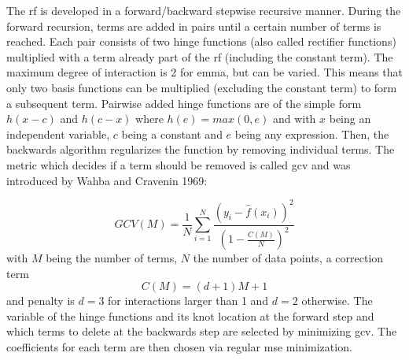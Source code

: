 The \gls{rf} is developed in a forward/backward stepwise recursive manner\cite{friedman1988fitting}. 
During the forward recursion, terms are added in pairs until a certain number of terms is reached. 
Each pair consists of two hinge functions (also called rectifier functions) multiplied with a term already part of the \gls{rf} (including the constant term).
The maximum degree of interaction is 2 for \gls{emma}, but can be varied. 
This means that only two basis functions can be multiplied (excluding the constant term) to form a subsequent term.
Pairwise added hinge functions are of the simple form $h(x-c)$ and $h(c-x)$ where $h(e)= max(0,e)$ and with $x$ being an independent variable, $c$ being a constant and $e$ being any expression. 
Then, the backwards algorithm regularizes the function by removing individual terms. 
The metric which decides if a term should be removed is called \gls{gcv} and was introduced by Wahba and Cravenin 1969\cite{wahba1979smoothing}:

\begin{equation}
    GCV(M) = \frac{1}{N} \sum_{i=1}^{N} \frac{ \left(y_i - \hat{f}(x_i) \right)^2 } {\left( 1- \frac{C(M)}{N}\right)^2 }
\end{equation}
with $M$ being the number of terms, $N$ the number of data points, a correction term
\begin{equation}
    C(M) = (d + 1)M + 1
\end{equation}
and penalty is $d=3$ for interactions larger than 1 and $d=2$ otherwise.
The variable of the hinge functions and its knot location at the forward step and which terms to delete 
at the backwards step are selected by minimizing \gls{gcv}. 
The coefficients for each term are then chosen via regular \gls{mse} minimization\cite{friedman1988fitting}.


\iffalse
